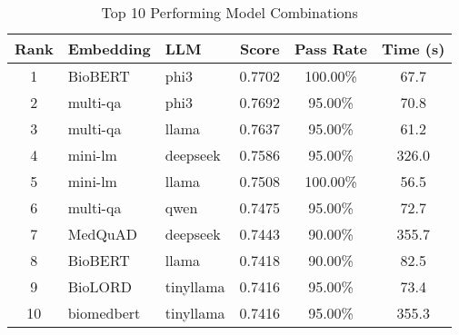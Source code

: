 \begin{table}[!htbp]
\centering
\begin{small}
\renewcommand\arraystretch{1.1}
\begin{tabular}{|c|l|l|c|c|c|}
\hline
\textbf{Rank} & \textbf{Embedding} & \textbf{LLM} & \textbf{Score} & \textbf{Pass Rate} & \textbf{Time (s)} \\
\hline
1 & BioBERT & phi3 & 0.7702 & 100.00\% & 67.7 \\
2 & multi-qa & phi3 & 0.7692 & 95.00\% & 70.8 \\
3 & multi-qa & llama & 0.7637 & 95.00\% & 61.2 \\
4 & mini-lm & deepseek & 0.7586 & 95.00\% & 326.0 \\
5 & mini-lm & llama & 0.7508 & 100.00\% & 56.5 \\
6 & multi-qa & qwen & 0.7475 & 95.00\% & 72.7 \\
7 & MedQuAD & deepseek & 0.7443 & 90.00\% & 355.7 \\
8 & BioBERT & llama & 0.7418 & 90.00\% & 82.5 \\
9 & BioLORD & tinyllama & 0.7416 & 95.00\% & 73.4 \\
10 & biomedbert & tinyllama & 0.7416 & 95.00\% & 355.3 \\
\hline
\end{tabular}
\end{small}
\caption{Top 10 Performing Model Combinations}
\label{tab:enhanced_top_performers}
\end{table}
